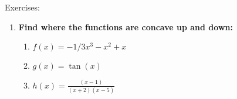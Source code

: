 \documentclass[../revisedmain.tex]{subfiles}
\begin{document}
\begin{center}
	{\Large Exercises:}
\end{center}
\begin{enumerate}
	\item \textbf{Find where the functions are concave up and down:}
	\begin{enumerate}
		\item $f(x)=-1/3x^3-x^2+x$
		\item $g(x)=\tan(x)$
		\item $h(x)=\displaystyle\frac{(x-1)}{(x+2)(x-5)}$
	\end{enumerate}
\end{enumerate}
\end{document}
